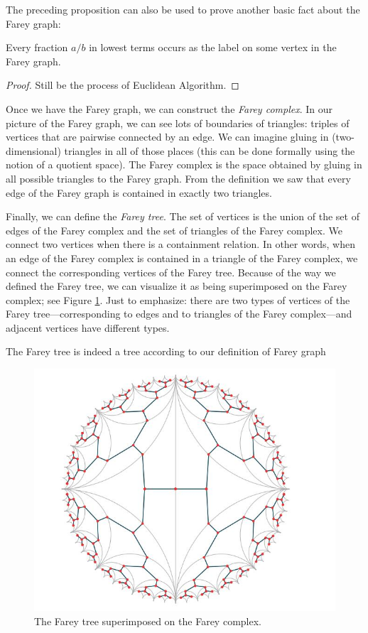 The preceding proposition can also be used to prove another basic fact about the
Farey graph:
\begin{proposition}
 Every fraction $a/b$ in lowest terms occurs as the label on some vertex in the Farey graph.
\end{proposition}
\begin{proof}
Still be the process of Euclidean Algorithm.
\end{proof}
Once we have the Farey graph, we can construct the \textit{Farey complex}. In our picture of the Farey graph, we can see lots of boundaries of triangles: triples of vertices that are pairwise connected by an edge. We can imagine gluing in (two-dimensional) triangles in all of those places (this can be done formally using the notion of a quotient space). The Farey complex is the space obtained by gluing in all possible triangles to the Farey graph. From the definition we saw that every edge of the Farey graph is contained in exactly two triangles.
\par
Finally, we can define the\textit{ Farey tree}. The set of vertices is the
union of the set of edges of the Farey complex and the set of triangles of the Farey
complex. We connect two vertices when there is a containment relation. In other
words, when an edge of the Farey complex is contained in a triangle of the Farey complex, we connect the corresponding vertices of the Farey tree. Because of the
way we defined the Farey tree, we can visualize it as being superimposed on the
Farey complex; see Figure \ref{FareyTree}. Just to emphasize: there are two types of vertices of the Farey tree—corresponding to edges and to triangles of the Farey complex—and
adjacent vertices have different types. 
\par
The Farey tree is indeed a tree according to our definition of Farey graph
\begin{figure}
    \centering
    \includegraphics[scale=0.5]{FareyTree.jpg}
    \caption{The Farey tree superimposed on the Farey complex.}
    \label{FareyTree}
\end{figure}



